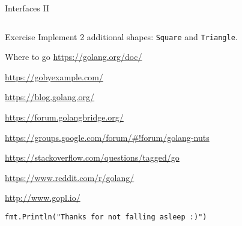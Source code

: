 \documentclass[10pt]{beamer}
\begin{document}
	\begin{frame}[t,fragile]{Interfaces II}
		\inputminted[fontsize=\scriptsize,firstnumber=last]{go}{code/17b_interfaces.go}
	\end{frame}
	
	
	\begin{frame}[fragile]{Exercise}
		Implement 2 additional shapes: \texttt{Square} and \texttt{Triangle}.
	\end{frame}
	
	
	\begin{frame}[fragile]{Where to go}
		\href{https://golang.org/doc/}{https://golang.org/doc/}
		
		\href{https://gobyexample.com/}{https://gobyexample.com/}
		
		\href{https://blog.golang.org/}{https://blog.golang.org/}
		
		\href{https://forum.golangbridge.org/}{https://forum.golangbridge.org/}
		
		\href{https://groups.google.com/forum/#!forum/golang-nuts}{https://groups.google.com/forum/\#!forum/golang-nuts}
		
		\href{https://stackoverflow.com/questions/tagged/go}{https://stackoverflow.com/questions/tagged/go}
		
		\href{https://www.reddit.com/r/golang/}{https://www.reddit.com/r/golang/}
		
		\href{http://www.gopl.io/}{http://www.gopl.io/}
	\end{frame}
									
	
	\begin{frame}[fragile]{}
		\begin{center}
			\texttt{fmt.Println("Thanks for not falling asleep :)")}
		\end{center}
	\end{frame}
\end{document}

